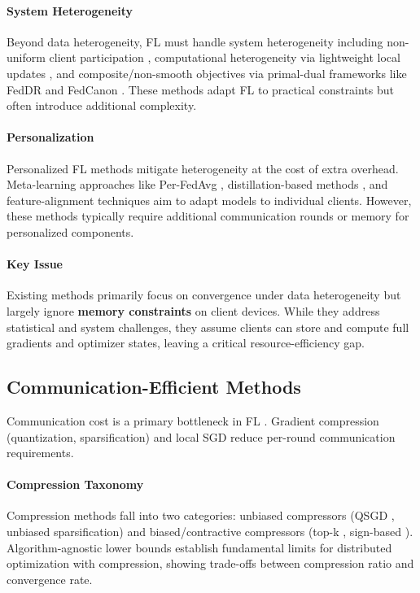 \paragraph{System Heterogeneity}
Beyond data heterogeneity, FL must handle system heterogeneity including non-uniform client participation \cite{xiang2023partial}, computational heterogeneity via lightweight local updates \cite{zhang2022lightweight}, and composite/non-smooth objectives via primal-dual frameworks like FedDR \cite{lu2020feddr} and FedCanon \cite{han2021fedcanon}. These methods adapt FL to practical constraints but often introduce additional complexity.

\paragraph{Personalization}
Personalized FL methods mitigate heterogeneity at the cost of extra overhead. Meta-learning approaches like Per-FedAvg \cite{fallah2020perfedavg}, distillation-based methods \cite{yao2021localglobal}, and feature-alignment techniques \cite{wang2025fedep} aim to adapt models to individual clients. However, these methods typically require additional communication rounds or memory for personalized components.

\paragraph{Key Issue}
Existing methods primarily focus on convergence under data heterogeneity but largely ignore \textbf{memory constraints} on client devices. While they address statistical and system challenges, they assume clients can store and compute full gradients and optimizer states, leaving a critical resource-efficiency gap.

\subsection{Communication-Efficient Methods}

Communication cost is a primary bottleneck in FL \cite{konecný2016strategies}. Gradient compression (quantization, sparsification) and local SGD reduce per-round communication requirements.

\paragraph{Compression Taxonomy}
Compression methods fall into two categories: unbiased compressors (QSGD \cite{alistarh2017qsgd}, unbiased sparsification) and biased/contractive compressors (top-k \cite{stich2018sparsification}, sign-based \cite{bernstein2018signsgd}). Algorithm-agnostic lower bounds \cite{he2023lowerbounds, safaryan2020uncertainty} establish fundamental limits for distributed optimization with compression, showing trade-offs between compression ratio and convergence rate.

